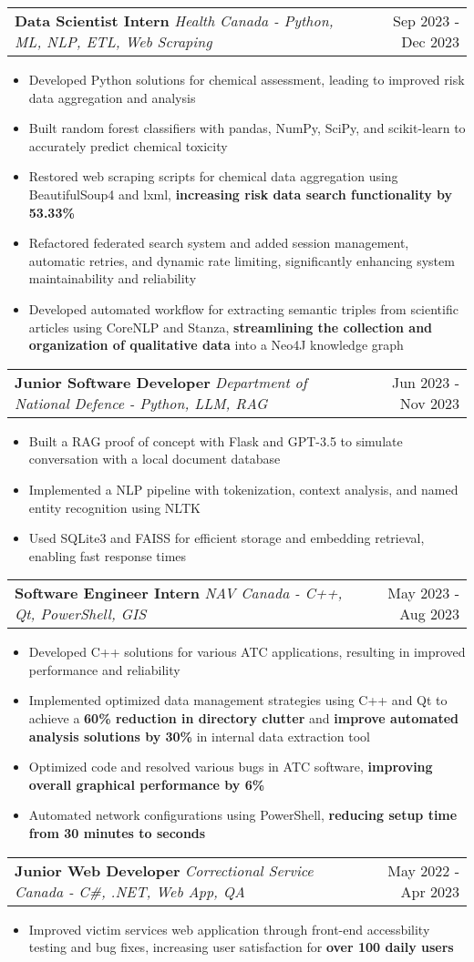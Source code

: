 \documentclass[letterpaper,11pt]{article}
\makeatletter
\newcommand{\resumeItem}[1]{
  \item\small{
    {#1 \vspace{-3pt}}
  }
}
\newcommand{\resumeSubheading}[3]{
    \item
    \begin{tabular*}{0.97\textwidth}[t]{l@{\extracolsep{\fill}}r}
      \textbf{#1} \textbar \textit{ #2} & #3 \\
    \end{tabular*}\vspace{-7.5pt}
}
\newcommand{\resumeItemListStart}{\begin{itemize}}
\newcommand{\resumeItemListEnd}{\end{itemize}\vspace{-5pt}}
\makeatother
\begin{document}
    \resumeSubheading
      {Data Scientist Intern}{Health Canada - Python, ML, NLP, ETL, Web Scraping}{Sep 2023 - Dec 2023}
      \resumeItemListStart
        \resumeItem{Developed Python solutions for chemical assessment, leading to improved risk data aggregation and analysis}
        \resumeItem{Built random forest classifiers with pandas, NumPy, SciPy, and scikit-learn to accurately predict chemical toxicity}
        \resumeItem{Restored web scraping scripts for chemical data aggregation using BeautifulSoup4 and lxml, \textbf{increasing risk data search functionality by 53.33\%}}
        \resumeItem{Refactored federated search system and added session management, automatic retries, and dynamic rate limiting, significantly enhancing system maintainability and reliability}
        \resumeItem{Developed automated workflow for extracting semantic triples from scientific articles using CoreNLP and Stanza, \textbf{streamlining the collection and organization of qualitative data} into a Neo4J knowledge graph}
      \resumeItemListEnd

    \resumeSubheading
    {Junior Software Developer}{Department of National Defence - Python, LLM, RAG}{Jun 2023 - Nov 2023}
      \resumeItemListStart
        \resumeItem{Built a RAG proof of concept with Flask and GPT-3.5 to simulate conversation with a local document database}
        \resumeItem{Implemented a NLP pipeline with tokenization, context analysis, and named entity recognition using NLTK}
        \resumeItem{Used SQLite3 and FAISS for efficient storage and embedding retrieval, enabling fast response times}
      \resumeItemListEnd

    \resumeSubheading
    {Software Engineer Intern}{NAV Canada - C++, Qt, PowerShell, GIS}{May 2023 - Aug 2023}
      \resumeItemListStart
        \resumeItem{Developed C++ solutions for various ATC applications, resulting in improved performance and reliability}
        \resumeItem{Implemented optimized data management strategies using C++ and Qt to achieve a \textbf{60\% reduction in directory clutter} and \textbf{improve automated analysis solutions by 30\%} in internal data extraction tool}
        \resumeItem{Optimized code and resolved various bugs in ATC software, \textbf{improving overall graphical performance by 6\%}}
        \resumeItem{Automated network configurations using PowerShell, \textbf{reducing setup time from 30 minutes to seconds}}
      \resumeItemListEnd

    \resumeSubheading
    {Junior Web Developer}{Correctional Service Canada - C\#, .NET, Web App, QA}{May 2022 - Apr 2023}
      \resumeItemListStart
        \resumeItem{Improved victim services web application through front-end accessbility testing and bug fixes, increasing user satisfaction for \textbf{over 100 daily users}}
      \resumeItemListEnd
\end{document}
